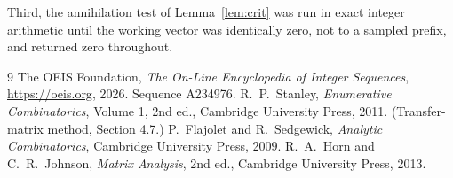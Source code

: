 \documentclass[11pt,a4paper]{article}
\theoremstyle{plain}
\theoremstyle{definition}
\begin{document}
Third, the annihilation test of Lemma~\ref{lem:crit} was run in exact integer arithmetic
until the working vector was identically zero, not to a sampled prefix, and returned zero
throughout.

\begin{thebibliography}{9}
 The OEIS Foundation, \emph{The On-Line Encyclopedia of Integer
Sequences}, \url{https://oeis.org}, 2026. Sequence A234976.
 R.~P.~Stanley, \emph{Enumerative Combinatorics}, Volume 1, 2nd ed.,
Cambridge University Press, 2011. (Transfer-matrix method, Section 4.7.)
 P.~Flajolet and R.~Sedgewick, \emph{Analytic Combinatorics}, Cambridge
University Press, 2009.
 R.~A.~Horn and C.~R.~Johnson, \emph{Matrix Analysis}, 2nd ed., Cambridge
University Press, 2013.
\end{thebibliography}
\end{document}
